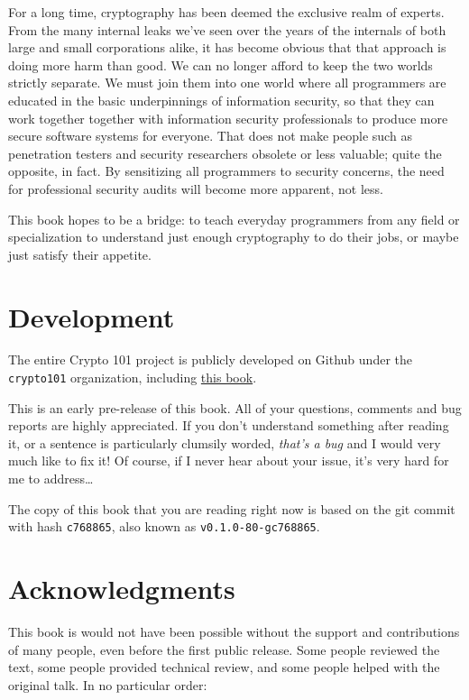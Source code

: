\documentclass[11pt,ebook,table,dvipsnames]{memoir}
\begin{document}
For a long time, cryptography has been deemed the exclusive realm of
experts. From the many internal leaks we've seen over the years of the
internals of both large and small corporations alike, it has become
obvious that that approach is doing more harm than good. We can no
longer afford to keep the two worlds strictly separate. We must join
them into one world where all programmers are educated in the basic
underpinnings of information security, so that they can work together
together with information security professionals to produce more
secure software systems for everyone. That does not make people such
as penetration testers and security researchers obsolete or less
valuable; quite the opposite, in fact. By sensitizing all programmers
to security concerns, the need for professional security audits will
become more apparent, not less.

This book hopes to be a bridge: to teach everyday programmers from any
field or specialization to understand just enough cryptography to do
their jobs, or maybe just satisfy their appetite.
\chapter{Development}
\label{sec-1-2}

The entire Crypto 101 project is publicly developed on Github under the
\verb~crypto101~ organization, including \href{https://www.github.com/crypto101/book}{this book}.

This is an early pre-release of this book. All of your questions,
comments and bug reports are highly appreciated. If you don't
understand something after reading it, or a sentence is particularly
clumsily worded, \emph{that's a bug} and I would very much like to fix it!
Of course, if I never hear about your issue, it's very hard for me to
address\ldots{}

The copy of this book that you are reading right now is based on the
git commit with hash \texttt{c768865}, also known as \texttt{v0.1.0-80-gc768865}.
\chapter{Acknowledgments}
\label{sec-1-3}

This book is would not have been possible without the support and
contributions of many people, even before the first public release.
Some people reviewed the text, some people provided technical review,
and some people helped with the original talk. In no particular order:
\end{document}
